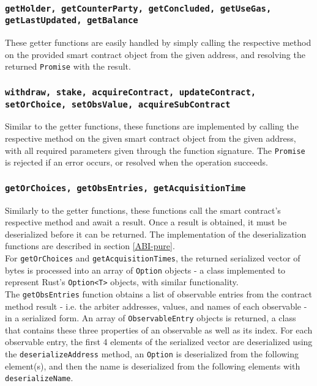 \subsubsection{\texttt{getHolder, getCounterParty, getConcluded, getUseGas, getLastUpdated, getBalance}}

These getter functions are easily handled by simply calling the respective method on the provided smart contract object from the given address, and resolving the returned \texttt{Promise} with the result.


\subsubsection{\texttt{withdraw, stake, acquireContract, updateContract, setOrChoice, setObsValue, acqui\-reSubContract}}

Similar to the getter functions, these functions are implemented by calling the respective method on the given smart contract object from the given address, with all required parameters given through the function signature. The \texttt{Promise} is rejected if an error occurs, or resolved when the operation succeeds.


\subsubsection{\texttt{getOrChoices, getObsEntries, getAcquisitionTime}}

Similarly to the getter functions, these functions call the smart contract's respective method and await a result. Once a result is obtained, it must be deserialized before it can be returned. The implementation of the deserialization functions are described in section \ref{ABI-pure}. \\

For \texttt{getOrChoices} and \texttt{getAcquisitionTimes}, the returned serialized vector of bytes is processed into an array of \texttt{Option} objects - a class implemented to represent Rust's \texttt{Option<T>} objects, with similar functionality. \\

The \texttt{getObsEntries} function obtains a list of observable entries from the contract method result - i.e. the arbiter addresses, values, and names of each observable - in a serialized form. An array of \texttt{ObservableEntry} objects is returned, a class that contains these three properties of an observable as well as its index. For each observable entry, the first 4 elements of the serialized vector are deserialized using the \texttt{deserializeAddress} method, an \texttt{Option} is deserialized from the following element(s), and then the name is deserialized from the following elements with \texttt{deserializeName}.


